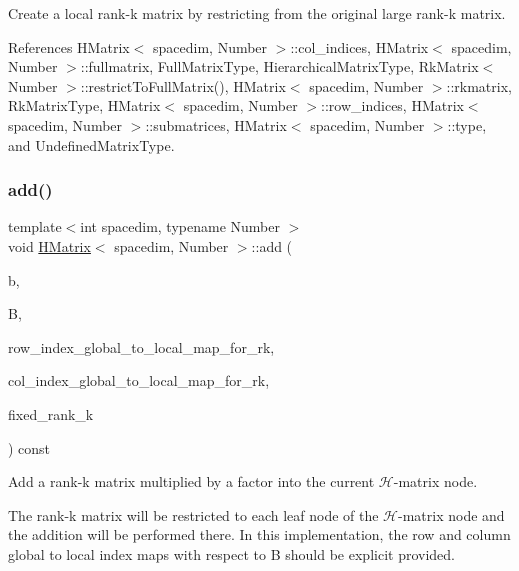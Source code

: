 Create a local rank-\/k matrix by restricting from the original large rank-\/k matrix.

References H\+Matrix$<$ spacedim, Number $>$\+::col\+\_\+indices, H\+Matrix$<$ spacedim, Number $>$\+::fullmatrix, Full\+Matrix\+Type, Hierarchical\+Matrix\+Type, Rk\+Matrix$<$ Number $>$\+::restrict\+To\+Full\+Matrix(), H\+Matrix$<$ spacedim, Number $>$\+::rkmatrix, Rk\+Matrix\+Type, H\+Matrix$<$ spacedim, Number $>$\+::row\+\_\+indices, H\+Matrix$<$ spacedim, Number $>$\+::submatrices, H\+Matrix$<$ spacedim, Number $>$\+::type, and Undefined\+Matrix\+Type.

\mbox{\label{classHMatrix_ad3800d6fded523d5c8eeb8fd0c106a34}} 
\subsubsection{\texorpdfstring{add()}{add()}\hspace{0.1cm}{\footnotesize\ttfamily [6/10]}}
{\footnotesize\ttfamily template$<$int spacedim, typename Number $>$ \\
void \hyperlink{classHMatrix}{H\+Matrix}$<$ spacedim, Number $>$\+::add (\begin{DoxyParamCaption}\item[{const Number}]{b,  }\item[{const \hyperlink{classRkMatrix}{Rk\+Matrix}$<$ Number $>$ \&}]{B,  }\item[{const std\+::map$<$ types\+::global\+\_\+dof\+\_\+index, size\+\_\+t $>$ \&}]{row\+\_\+index\+\_\+global\+\_\+to\+\_\+local\+\_\+map\+\_\+for\+\_\+rk,  }\item[{const std\+::map$<$ types\+::global\+\_\+dof\+\_\+index, size\+\_\+t $>$ \&}]{col\+\_\+index\+\_\+global\+\_\+to\+\_\+local\+\_\+map\+\_\+for\+\_\+rk,  }\item[{const \hyperlink{classHMatrix_a5ca8dc549783d38371a01ecd621ecb34}{size\+\_\+type}}]{fixed\+\_\+rank\+\_\+k }\end{DoxyParamCaption}) const}

Add a rank-\/k matrix multiplied by a factor into the current $\mathcal{H}$-\/matrix node.

The rank-\/k matrix will be restricted to each leaf node of the $\mathcal{H}$-\/matrix node and the addition will be performed there. In this implementation, the row and column global to local index maps with respect to {\ttfamily B} should be explicit provided.


